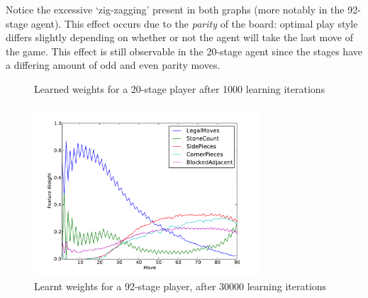 \documentclass[11pt]{article}
\begin{document}
Notice the excessive `zig-zagging' present in both graphs (more notably in the
92-stage agent). This effect occurs due to the \emph{parity} of the board:
optimal play style differs slightly depending on whether or not the
agent will take the last move of the game. This effect is still observable in
the 20-stage agent since the stages have a differing amount of odd and even
parity moves.

\begin{figure}[htbp]
  \centering
  \caption{Learned weights for a 20-stage player after 1000 learning
    iterations}
  \label{WeightsOverTime}
\end{figure}

\begin{figure}[htbp]
  \centering
  \includegraphics[trim=0cm 0cm 1.5cm 1cm, clip, width=0.75\textwidth]
    {../Graphs/finalweights.pdf}
  \caption{Learnt weights for a 92-stage player, after 30000 learning iterations}
  \label{WeightsOverTime92}
\end{figure}
\end{document}
